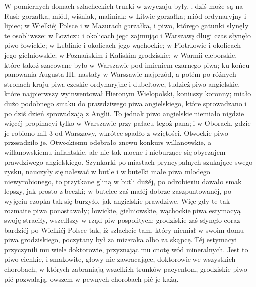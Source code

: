 \documentclass{book}
\begin{document}
W pomiernych domach szlacheckich trunki w zwyczaju były, i dziś może są na Rusi: gorzałka, miód, wiśniak, maliniak; w Litwie gorzałka; miód ordynaryjny i lipiec; w Wielkiéj Polsce i w Mazurach gorzałka, i piwo, którego gatunki słynęły te osobliwsze: w Łowiczu i okolicach jego zajmując i Warszawę długi czas słynęło piwo łowickie; w Lublinie i okolicach jego wąchockie; w Piotrkowie i okolicach jego gielniowskie; w Poznańskim i Kaliskim grodziskie; w Warmii eleborskie, które takoż szacowane było w Warszawie pod imieniem czarnego piwa; ku końcu panowania Augusta III. nastały w Warszawie najprzód, a potém po różnych stronach kraju piwa czeskie ordynaryjne i dubeltowe, tudzież piwo angielskie, które najpierwszy wyinwentował Hieronym Wielopolski, koniuszy koronny; miało dużo podobnego smaku do prawdziwego piwa angielskiego, które sprowadzano i po dziś dzień sprowadzają z Anglii. To jednak piwo angielskie niemiało nigdzie więcéj propinacyi tylko w Warszawie przy pałacu tegoż pana; i w Oborach, gdzie je robiono mil 3 od Warszawy, wkrótce spadło z wziętości. Otwockie piwo przesadziło je. Otwockiemu odebrało znowu konkurs willanowskie, a willanowskiemu inflantskie, ale nie tak mocne i nieburzące się obyczajem prawdziwego angielskiego. Szynkarki po miastach pryncypalnych szukające swego zysku, nauczyły się nalewać w butle i w butelki małe piwa młodego niewyrobionego, to przytkane gliną w butli dużéj, po odrobieniu dawało smak lepszy, jak prosto z beczki; w butelce zaś małéj dobrze zaszpuntowanéj, po wyjęciu czopka tak się burzyło, jak angielskie prawdziwe. Więc gdy te tak rozmaite piwa ponastawały; łowickie, gielniowskie, wąchockie piwa estymacyą swoję straciły, wszedłszy w rząd piw pospolitych; grodziskie zaś słynęło coraz bardziéj po Wielkiéj Polsce tak, iż szlachcic tam, który niemiał w swoim domu piwa grodziskiego, poczytany był za mizeraka albo za skąpcę. Téj estymacyi przyczynili mu wiele doktorowie, przyznając mu cnotę wód mineralnych. Jest to piwo cienkie, i smakowite, głowy nie zawracające, doktorowie we wszystkich chorobach, w których zabraniają wszelkich trunków pacyentom, grodziskie piwo pić pozwalają, owszem w pewnych chorobach pić je każą.
\end{document}
